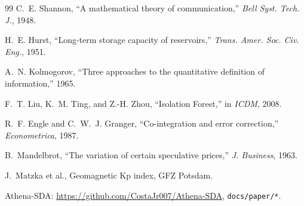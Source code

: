 \documentclass[11pt,a4paper]{article}
\begin{document}
\begin{thebibliography}{99}
C.~E. Shannon, ``A mathematical theory of communication,'' \textit{Bell Syst. Tech. J.}, 1948.

H.~E. Hurst, ``Long-term storage capacity of reservoirs,'' \textit{Trans. Amer. Soc. Civ. Eng.}, 1951.

A.~N. Kolmogorov, ``Three approaches to the quantitative definition of information,'' 1965.

F.~T. Liu, K.~M. Ting, and Z.-H. Zhou, ``Isolation Forest,'' in \textit{ICDM}, 2008.

R.~F. Engle and C.~W.~J. Granger, ``Co-integration and error correction,'' \textit{Econometrica}, 1987.

B.~Mandelbrot, ``The variation of certain speculative prices,'' \textit{J. Business}, 1963.

J.~Matzka et al., Geomagnetic Kp index, GFZ Potsdam.

Athena-SDA: \url{https://github.com/CostaJr007/Athena-SDA}, \texttt{docs/paper/*}.
\end{thebibliography}
\end{document}
